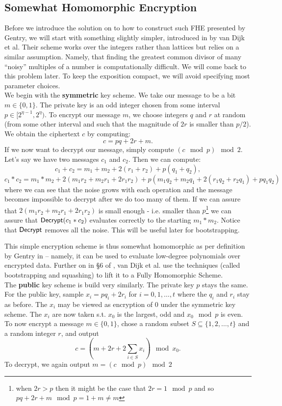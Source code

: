\subsection{Somewhat Homomorphic Encryption}
Before we introduce the solution on to how to construct such FHE presented by Gentry, we will start with something slightly simpler, introduced in \cite{int_scheme} by van Dijk et al. Their scheme works over the integers rather than lattices but relies on a similar assumption. Namely, that finding the greatest common divisor of many “noisy” multiples of a number is computationally difficult. We will come back to this problem later. To keep the exposition compact, we will avoid specifying most parameter choices. \\

We begin with the \textbf{symmetric} key scheme. We take our message to be a bit $m \in \{0,1\}$. The private key is an odd integer chosen from some interval $p \in [2^{\eta - 1}, 2^{\eta})$. To encrypt our message $m$, we choose integers $q$ and $r$ at random (from some other interval and such that the magnitude of $2r$ is smaller than $p/2$). We obtain the ciphertext $c$ by computing: 
$$c = pq + 2r + m.$$
If we now want to decrypt our message, simply compute $(c \mod p) \mod 2$. \\
Let's say we have two messages $c_1$ and $c_2$. Then we can compute:
$$ c_1 + c_2 = m_1 + m_2 + 2(r_1 + r_2) + p(q_1 + q_2),$$
$$ c_1 * c_2 = m_1 * m_2 + 2(m_1r_2 + m_2r_1 + 2r_1r_2) + p(m_1q_2 + m_2q_1 + 2(r_1q_2 + r_2q_1) + pq_1q_2)$$
where we can see that the noise grows with each operation and the message becomes impossible to decrypt after we do too many of them. If we can assure that $2(m_1r_2 + m_2r_1 + 2r_1r_2)$ is small enough - i.e. smaller than $p$\footnote{when $2r > p$ then it might be the case that $2r = 1 \mod p$ and so $pq + 2r + m \mod p = 1 + m \neq m$} we can assure that $\alg{Decrypt}(c_1 * c_2)$ evaluates correctly to the starting $m_1 * m_2$. Notice that $\alg{Decrypt}$ removes all the noise. This will be useful later for bootstrapping.

This simple encryption scheme is thus somewhat homomorphic as per definition by Gentry in \cite{gentry_phd} – namely, it can be used to evaluate low-degree polynomials over encrypted data. Further on in \S 6 of \cite{int_scheme}, van Dijk et al. use the techniques (called bootstrapping and squashing) to lift it to a Fully Homomorphic Scheme. \\

The \textbf{public} key scheme is build very similarly. The private key $p$ stays the same. For the public key, sample $x_i = p q_i + 2r_i$ for $i = 0, 1, \dots, t$ where the $q_i$ and $r_i$ stay as before. The $x_i$ may be viewed as encryption of 0 under the symmetric key scheme. The $x_i$ are now taken s.t. $x_0$ is the largest, odd and $x_0 \mod p$ is even. To now encrypt a message $m \in \{0,1\}$, chose a random subset $S \subseteq \{1, 2, \dots, t\}$ and a random integer $r$, and output
$$ c = (m + 2r + 2\sum_{i \in S} x_i) \mod x_0. $$
To decrypt, we again output $m = (c \mod p) \mod 2$ \\

